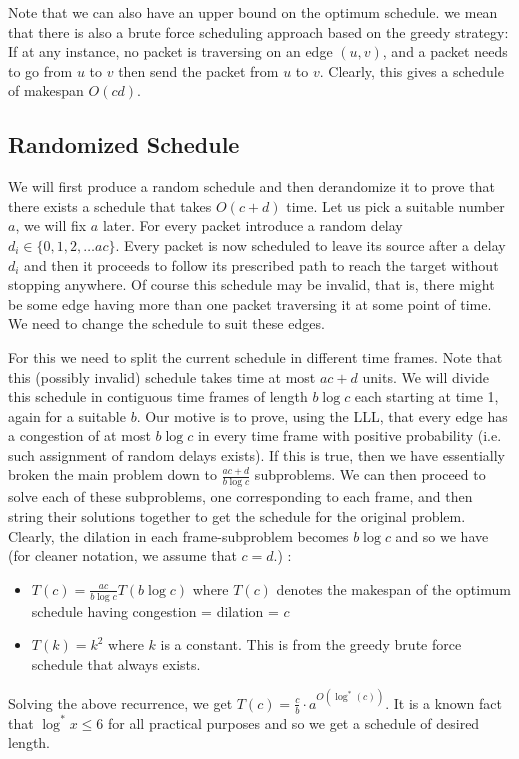 Note that we can also have an upper bound on the optimum schedule. we mean that there is also a brute force scheduling approach based on the greedy strategy: If at any instance, no packet is traversing on an edge $(u,v)$, and a packet needs to go from $u$ to $v$ then send the packet from $u$ to $v$. Clearly, this gives a schedule of makespan $O(cd)$.

\subsection{Randomized Schedule}
We will first produce a random schedule and then derandomize it to prove that there exists a schedule that takes $O(c+d)$ time. Let us pick a suitable number $a$, we will fix $a$ later. For every packet introduce a random delay $d_i\in\{0,1,2,\ldots ac\} $. Every packet is now scheduled to leave its source after a delay $d_i$ and then it proceeds to follow its prescribed path to reach the target without stopping anywhere. Of course this schedule may be invalid, that is, there might be some edge having more than one packet traversing it at some point of time. We need to change the schedule to suit these edges.

For this we need to split the current schedule in different time frames. Note that this (possibly invalid) schedule takes time at most $ac+d$ units. We will divide this schedule in contiguous time frames of length $b\log c$ each starting at time 1, again for a suitable $b$. Our motive is to prove, using the LLL, that every edge has a congestion of at most $b\log c$ in every time frame with positive probability (i.e. such assignment of random delays exists). If this is true, then we have essentially broken the main problem down to $\frac{ac+d}{b\log c} $ subproblems. We can then proceed to solve each of these subproblems, one corresponding to each frame, and then string their solutions together to get the schedule for the original problem. Clearly, the dilation in each frame-subproblem becomes $b\log c$ and so we have (for cleaner notation, we assume that $c=d$.) :
\begin{itemize}
 \item $T(c) = \frac{ac}{b\log c}T(b\log c) $ where $T(c)$ denotes the makespan of the optimum schedule having congestion = dilation = $c$
 \item $T(k) = k^2 $ where $k$ is a constant. This is from the greedy brute force schedule that always exists.
\end{itemize}
Solving the above recurrence, we get $T(c)= \frac{c}{b}\cdot a^{O(\log^*(c)) } $. It is a known fact that $\log^*x \leq 6$ for all practical purposes and so we get a schedule of desired length.

